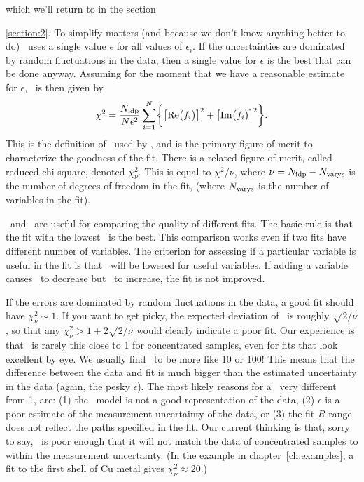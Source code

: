 which we'll return to in the section~{\ref{section:2}.  To simplify
matters (and because we don't know anything better to do) \feffit\
uses a single value $\epsilon$ for all values of $\epsilon_i$.  If the
uncertainties are dominated by random fluctuations in the data, then a
single value for $\epsilon$ is the best that can be done anyway.
Assuming for the moment that we have a reasonable estimate for
$\epsilon$, \chisqr\ is then given by 
\begin{equation}
\chi^2 = { {N_{\rm idp} } \over N \epsilon^2}  \sum_{i=1}^{N} 
  \biggl\{ {\bigl[ {\rm Re} \big( f_i \big) \bigr]^2 + \bigl[ {\rm Im}
          \big( f_i \big) \bigr]^2 } \biggl\}.
\end{equation}
\noindent 
This is the definition of \chisqr\ used by \feffit, and is the primary
figure-of-merit to characterize the goodness of the fit.  There is a
related figure-of-merit, called reduced chi-square, denoted
$\chi^2_{\nu}$.  This is equal to $ {\chi^2 / \nu}$, where $\nu =
N_{\rm idp} - N_{\rm varys}$ is the number of degrees of freedom in
the fit, (where $N_{\rm varys}$ is the number of variables in the
fit).

\chisqr\ and \redchi\ are useful for comparing the quality of
different fits.  The basic rule is that the fit with the lowest
\redchi\ is the best.  This comparison works even if two fits have
different number of variables.  The criterion for assessing if a
particular variable is useful in the fit is that \redchi\ will be
lowered for useful variables.  If adding a variable causes \chisqr\ to
decrease but \redchi\ to increase, the fit is not improved.

If the errors are dominated by random fluctuations in the data, a good fit
should have $\chi^2_{\nu} \sim 1$.  If you want to get picky, the expected
deviation of \redchi\ is roughly $\sqrt{2/\nu}$, so that any $\chi^2_{\nu}
> 1 + 2\sqrt{2/\nu}$ would clearly indicate a poor fit.  Our experience is
that \redchi\ is rarely this close to 1 for concentrated samples, even for
fits that look excellent by eye.  We usually find \redchi\ to be more like
10 or 100!  This means that the difference between the data and fit is much
bigger than the estimated uncertainty in the data (again, the pesky
$\epsilon$).  The most likely reasons for a \redchi\ very different from 1,
are: (1) the \feff\ model is not a good representation of the data, (2)
$\epsilon$ is a poor estimate of the measurement uncertainty of the data,
or (3) the fit $R$-range does not reflect the paths specified in the fit.
Our current thinking is that, sorry to say, \feff\ is poor enough that it
will not match the data of concentrated samples to within the measurement
uncertainty. (In the example in chapter~{\ref{ch:examples}}, a fit to the
first shell of Cu metal gives $\chi^2_{\nu} \approx 20$.)

}
